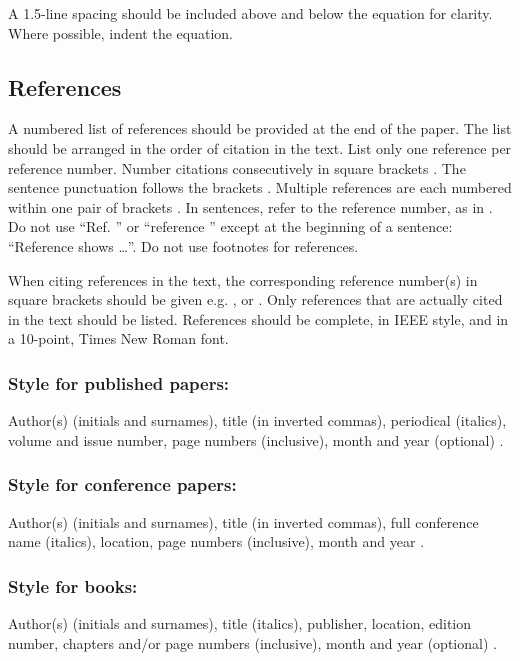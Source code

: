 \documentclass[10pt,twocolumn]{witseiepaper}
\begin{document}
A 1.5-line spacing should be included above and below the equation for clarity.
Where possible, indent the equation.

\subsection{References}

A numbered list of references should be provided at the end of the paper. The
list should be arranged in the order of citation in the text. List only one
reference per reference number. Number citations consecutively in square
brackets \cite{muller:2003:dbr}. The sentence punctuation follows the brackets
\cite{finn:2003:dip}. Multiple references are each numbered within one pair of
brackets \cite{finn:2003:dip,vas:1992:smi}. In sentences, refer to the
reference number, as in \cite{vas:1992:smi}. Do not use ``Ref.
\cite{vas:1992:smi}'' or ``reference \cite{vas:1992:smi}'' except at the
beginning of a sentence: ``Reference \cite{vas:1992:smi} shows \ldots''. Do
not use footnotes for references.

When citing references in the text, the corresponding reference number(s) in
square brackets should be given e.g. \cite{muller:2003:dbr},
\cite{muller:2003:dbr,vas:1992:smi,abdel-salam:1990:elf} or
\cite{muller:2003:dbr,finn:2003:dip,vas:1992:smi,abdel-salam:1990:elf}. Only
references that are actually cited in the text should be listed. References
should be complete, in IEEE style, and in a 10-point, Times New Roman font.

\subsubsection*{Style for published papers:} Author(s) (initials and surnames),
title (in inverted commas), periodical (italics), volume and issue number, page
numbers (inclusive), month and year (optional) \cite{muller:2003:dbr,finn:2003:dip}.

\subsubsection*{Style for conference papers:} Author(s) (initials and surnames),
title (in inverted commas), full conference name (italics), location, page
numbers (inclusive), month and year \cite{vas:1992:smi}.

\subsubsection*{Style for books:} Author(s) (initials and surnames), title
(italics), publisher, location, edition number, chapters and/or page numbers
(inclusive), month and year (optional) \cite{abdel-salam:1990:elf}.
\end{document}
